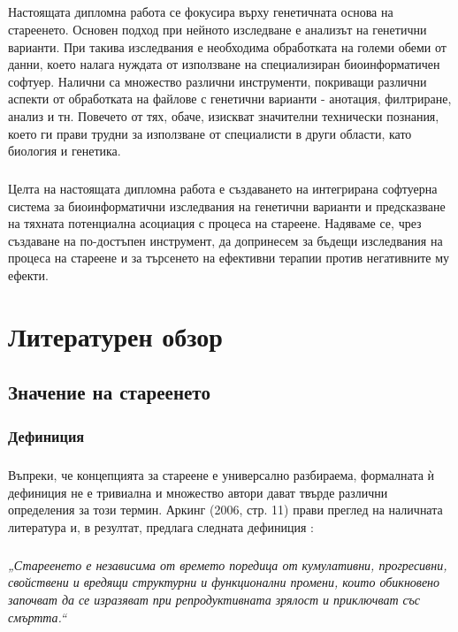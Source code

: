 \documentclass[pdftex,cyrillic,14pt,a4page,twoside]{extreport}
\begin{document}
\paragraph{}
Настоящата дипломна работа се фокусира върху генетичната основа на стареенето. Основен подход при нейното изследване е анализът на генетични варианти. При такива изследвания е необходима обработката на големи обеми от данни, което налага нуждата от използване на специализиран биоинформатичен софтуер. Налични са множество различни инструменти, покриващи различни аспекти от обработката на файлове с генетични варианти - анотация, филтриране, анализ и тн. Повечето от тях, обаче, изискват значителни технически познания, което ги прави трудни за използване от специалисти в други области, като биология и генетика.

\paragraph{}
Целта на настоящата дипломна работа е създаването на интегрирана софтуерна система за биоинформатични изследвания на генетични варианти и предсказване на тяхната потенциална асоциация с процеса на стареене. Надяваме се, чрез създаване на по-достъпен инструмент, да допринесем за бъдещи изследвания на процеса на стареене и за търсенето на ефективни терапии против негативните му ефекти.
            
\chapter{Литературен обзор}
\section{Значение на стареенето}
\subsection{Дефиниция}
\paragraph{}
Въпреки, че концепцията за стареене е универсално разбираема, формалната ѝ дефиниция не е тривиална и множество автори дават твърде различни определения за този термин. Аркинг (2006, стр. 11) прави преглед на наличната литература и, в резултат, предлага следната дефиниция \cite{arking2006biology}:

\paragraph{}
\textit{„Стареенето е независима от времето поредица от кумулативни, прогресивни, свойствени и вредящи структурни и функционални промени, които обикновено започват да се изразяват при репродуктивната зрялост и приключват със смъртта.“}
\end{document}
